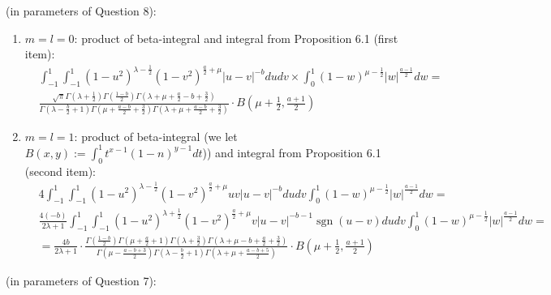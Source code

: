 \documentclass{article}
\newcommand{\assign}{:=}
\newcommand{\tmop}[1]{\ensuremath{\operatorname{#1}}}
\newenvironment{enumeratenumeric}{\begin{enumerate}[1.] }{\end{enumerate}}
\begin{document}
\begin{answer}
  (in parameters of Question 8):
  \begin{enumeratenumeric}
    \item $m = l = 0$: product of beta-integral and integral from Proposition
    6.1 (first item):
    \begin{eqnarray}
      & \int_{- 1}^1 \int_{- 1}^1 (1 - u^2)^{\lambda - \frac{1}{2}} (1 -
      v^2)^{\frac{a}{2} + \mu} | u - v |^{- b} d u d v \times \int_0^1 (1 -
      w)^{\mu - \frac{1}{2}} | w |^{\frac{a - 1}{2}} d w = &  \nonumber\\
      & \frac{\sqrt{\pi} \Gamma (\lambda + \frac{1}{2}) \Gamma \left( \frac{1
      - b}{2} \right) \Gamma (\lambda + \mu + \frac{a}{2} - b +
      \frac{3}{2})}{\Gamma \left( \lambda - \frac{b}{2} + 1 \right) \Gamma
      \left( \mu + \frac{a - b}{2} + \frac{3}{2} \right) \Gamma \left( \lambda
      + \mu + \frac{a - b}{2} + \frac{3}{2} \right)} \cdot B \left( \mu +
      \frac{1}{2}, \frac{a + 1}{2} \right) &  \nonumber
    \end{eqnarray}
    \item $m = l = 1$: product of beta-integral (we let $B (x, y) \assign
    \int_0^1 t^{x - 1} (1 - n)^{y - 1} d t$)) and integral from Proposition
    6.1 (second item):
    \begin{eqnarray}
      & 4 \int_{- 1}^1 \int_{- 1}^1 (1 - u^2)^{\lambda - \frac{1}{2}} (1 -
      v^2)^{\frac{a}{2} + \mu} u v | u - v |^{- b} d u d v \int_0^1 (1 -
      w)^{\mu - \frac{1}{2}} | w |^{\frac{a - 1}{2}} d w = &  \nonumber\\
      & \frac{4 (- b)}{2 \lambda + 1} \int_{- 1}^1 \int_{- 1}^1 (1 -
      u^2)^{\lambda + \frac{1}{2}} (1 - v^2)^{\frac{a}{2} + \mu} v | u - v
      |^{- b - 1} \tmop{sgn} (u - v) d u d v \int_0^1 (1 - w)^{\mu -
      \frac{1}{2}} | w |^{\frac{a - 1}{2}} d w = &  \nonumber\\
      & = \frac{4 b}{2 \lambda + 1} \cdot \frac{\Gamma \left( \frac{1 - b}{2}
      \right) \Gamma \left( \mu + \frac{a}{2} + 1 \right) \Gamma \left(
      \lambda + \frac{3}{2} \right) \Gamma \left( \lambda + \mu - b +
      \frac{a}{2} + \frac{3}{2} \right)}{\Gamma \left( \mu - \frac{a - b +
      3}{2} \right) \Gamma \left( \lambda - \frac{b}{2} + 1 \right) \Gamma
      \left( \lambda + \mu + \frac{a - b + 5}{2} \right)} \cdot B \left( \mu +
      \frac{1}{2}, \frac{a + 1}{2} \right) &  \nonumber
    \end{eqnarray}
  \end{enumeratenumeric}
  (in parameters of Question 7):
  \begin{enumeratenumeric}

\end{enumeratenumeric}
\end{answer}
\end{document}
